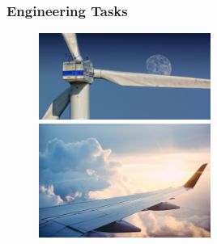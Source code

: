 \documentclass{beamer}
\begin{document}
\begin{frame}
\frametitle{Engineering Tasks}%
\begin{figure}[h]
\centering
\includegraphics[width=0.5\textwidth, trim = 0cm 0cm 0cm 0cm, clip]{img/windmill-50512_1280.jpg}%

\includegraphics[width=0.5\textwidth, trim = 0cm 0cm 0cm 0cm, clip]{img/plane-841441_1920.jpg}%
\caption{ ~\parencite{windTurbines}}
\end{figure}
\end{frame}
\end{document}
